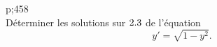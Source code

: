 \begin{exercice}
    \cite{exos_oraux} p;458 \\
    Déterminer les solutions sur $2.3$ de l'équation
    $$y' = \sqrt{1-y^2}.$$
\end{exercice}

\begin{solution}
\end{solution}